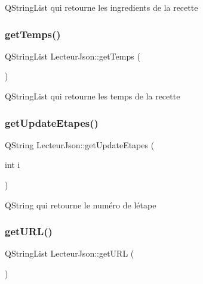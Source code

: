Q\+String\+List qui retourne les ingredients de la recette \mbox{\label{class_lecteur_json_a88d73523c1775a8c7001b5abae152740}} 
\subsubsection{\texorpdfstring{get\+Temps()}{getTemps()}}
{\footnotesize\ttfamily Q\+String\+List Lecteur\+Json\+::get\+Temps (\begin{DoxyParamCaption}{ }\end{DoxyParamCaption})\hspace{0.3cm}{\ttfamily [inline]}}

Q\+String\+List qui retourne les temps de la recette \mbox{\label{class_lecteur_json_ad3a86b8dc577d1e6d77a66b8ece8442a}} 
\subsubsection{\texorpdfstring{get\+Update\+Etapes()}{getUpdateEtapes()}}
{\footnotesize\ttfamily Q\+String Lecteur\+Json\+::get\+Update\+Etapes (\begin{DoxyParamCaption}\item[{int}]{i }\end{DoxyParamCaption})\hspace{0.3cm}{\ttfamily [inline]}}

Q\+String qui retourne le numéro de l\textquotesingle{}étape \mbox{\label{class_lecteur_json_a4ceacda970b2b838bb41211decdd799f}} 
\subsubsection{\texorpdfstring{get\+U\+R\+L()}{getURL()}}
{\footnotesize\ttfamily Q\+String\+List Lecteur\+Json\+::get\+U\+RL (\begin{DoxyParamCaption}{ }\end{DoxyParamCaption})\hspace{0.3cm}{\ttfamily [inline]}}


